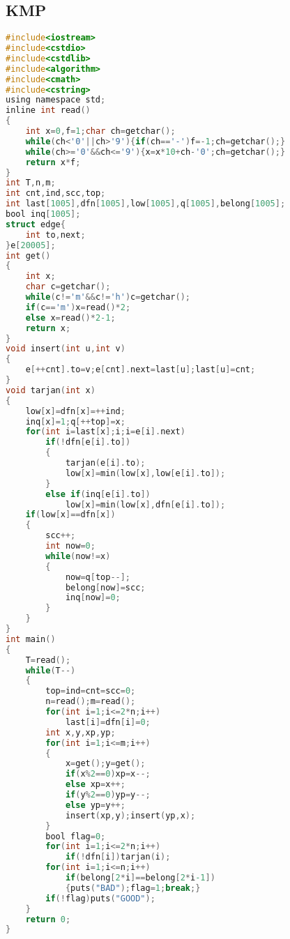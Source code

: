 \subsection{KMP}
\begin{lstlisting}[language=C]
#include<iostream>
#include<cstdio>
#include<cstdlib>
#include<algorithm>
#include<cmath>
#include<cstring>
using namespace std;
inline int read()
{
    int x=0,f=1;char ch=getchar();
    while(ch<'0'||ch>'9'){if(ch=='-')f=-1;ch=getchar();}
    while(ch>='0'&&ch<='9'){x=x*10+ch-'0';ch=getchar();}
    return x*f;
}
int T,n,m;
int cnt,ind,scc,top;
int last[1005],dfn[1005],low[1005],q[1005],belong[1005];
bool inq[1005];
struct edge{
	int to,next;
}e[20005];
int get()
{
	int x;
	char c=getchar();
	while(c!='m'&&c!='h')c=getchar();
	if(c=='m')x=read()*2;
	else x=read()*2-1;
	return x;
}
void insert(int u,int v)
{
	e[++cnt].to=v;e[cnt].next=last[u];last[u]=cnt;
}
void tarjan(int x)
{
	low[x]=dfn[x]=++ind;
	inq[x]=1;q[++top]=x;
	for(int i=last[x];i;i=e[i].next)
		if(!dfn[e[i].to])
		{
			tarjan(e[i].to);
			low[x]=min(low[x],low[e[i].to]);
		}
		else if(inq[e[i].to])
			low[x]=min(low[x],dfn[e[i].to]);
	if(low[x]==dfn[x])
	{
		scc++;
		int now=0;
		while(now!=x)
		{
			now=q[top--];
			belong[now]=scc;
			inq[now]=0;
		}
	}
}
int main()
{
	T=read();
	while(T--)
	{
		top=ind=cnt=scc=0;
		n=read();m=read();
		for(int i=1;i<=2*n;i++)
			last[i]=dfn[i]=0;
		int x,y,xp,yp;
		for(int i=1;i<=m;i++)
		{
			x=get();y=get();
			if(x%2==0)xp=x--;
			else xp=x++;
			if(y%2==0)yp=y--;
			else yp=y++;
			insert(xp,y);insert(yp,x);
		}
		bool flag=0;
		for(int i=1;i<=2*n;i++)
			if(!dfn[i])tarjan(i);
		for(int i=1;i<=n;i++)
			if(belong[2*i]==belong[2*i-1])
			{puts("BAD");flag=1;break;}
		if(!flag)puts("GOOD");
	}
	return 0;
}
\end{lstlisting} 
